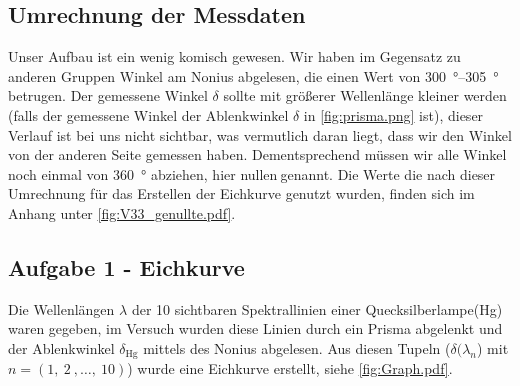 \subsection{Umrechnung der Messdaten}
Unser Aufbau ist ein wenig komisch gewesen. Wir haben im Gegensatz zu anderen Gruppen Winkel am Nonius abgelesen, die einen Wert von \qtyrange{300}{305}{\degree} betrugen. Der gemessene Winkel \(\delta\) sollte mit größerer Wellenlänge kleiner werden (falls der gemessene Winkel der Ablenkwinkel \(\delta\) in \cref{fig:prisma.png} ist), dieser Verlauf ist bei uns nicht sichtbar, was vermutlich daran liegt, dass wir den Winkel \glqq von der anderen Seite\grqq{} gemessen haben. Dementsprechend müssen wir alle Winkel noch einmal von \qty{360}{\degree} abziehen, hier \glqq nullen\grqq \(\ \)genannt. Die Werte die nach dieser Umrechnung für das Erstellen der Eichkurve genutzt wurden, finden sich im Anhang unter \cref{fig:V33_genullte.pdf}.

\subsection{Aufgabe 1 - Eichkurve}
Die Wellenlängen \(\lambda\) der 10 sichtbaren Spektrallinien einer Quecksilberlampe(Hg) waren gegeben, im Versuch wurden diese Linien durch ein Prisma abgelenkt und der Ablenkwinkel \(\delta_{\text{Hg}}\) mittels des Nonius abgelesen. Aus diesen Tupeln (\(\delta(\lambda_n\)) mit \(n=(1,\ 2\ ,\ldots,\ 10)\)) wurde eine Eichkurve erstellt, siehe \cref{fig:Graph.pdf}.

\clearpage 

